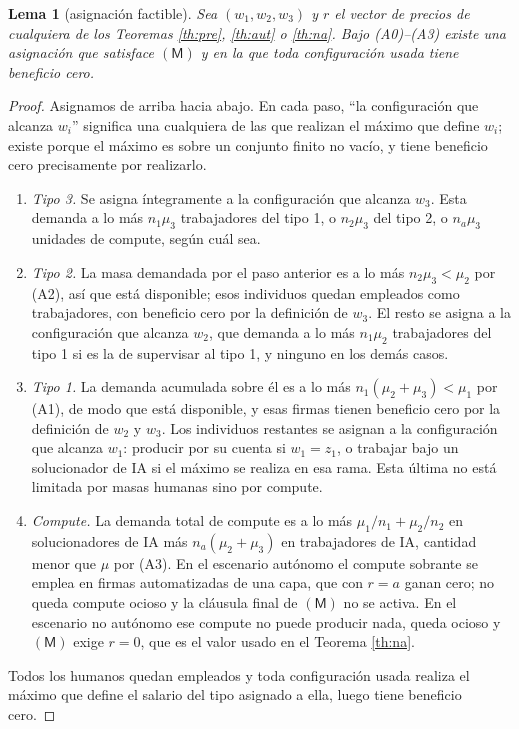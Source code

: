 \documentclass[11pt]{article}
\theoremstyle{plain}
\newtheorem{lema}{Lema}
\theoremstyle{definition}
\theoremstyle{remark}
\newcommand{\ai}{a}
\newcommand{\Mk}{\mathsf{M}}
\begin{document}
\begin{lema}[asignación factible]\label{lem:asignacion}
Sea $(w_1,w_2,w_3)$ y $r$ el vector de precios de cualquiera de los Teoremas \ref{th:pre},
\ref{th:aut} o \ref{th:na}. Bajo (A0)--(A3) existe una asignación que satisface $(\Mk)$ y en la que
toda configuración usada tiene beneficio cero.
\end{lema}
\begin{proof}
Asignamos de arriba hacia abajo. En cada paso, ``la configuración que alcanza $w_i$'' significa una
cualquiera de las que realizan el máximo que define $w_i$; existe porque el máximo es sobre un
conjunto finito no vacío, y tiene beneficio cero precisamente por realizarlo.
\begin{enumerate}[label=(\arabic*),leftmargin=2.4em]
  \item \emph{Tipo 3.} Se asigna íntegramente a la configuración que alcanza $w_3$. Esta demanda a lo
  más $n_1\mu_3$ trabajadores del tipo 1, o $n_2\mu_3$ del tipo 2, o $n_a\mu_3$ unidades de compute,
  según cuál sea.
  \item \emph{Tipo 2.} La masa demandada por el paso anterior es a lo más $n_2\mu_3<\mu_2$ por (A2),
  así que está disponible; esos individuos quedan empleados como trabajadores, con beneficio cero por
  la definición de $w_3$. El resto se asigna a la configuración que alcanza $w_2$, que demanda a lo
  más $n_1\mu_2$ trabajadores del tipo 1 si es la de supervisar al tipo 1, y ninguno en los demás
  casos.
  \item \emph{Tipo 1.} La demanda acumulada sobre él es a lo más $n_1(\mu_2+\mu_3)<\mu_1$ por (A1), de
  modo que está disponible, y esas firmas tienen beneficio cero por la definición de $w_2$ y $w_3$.
  Los individuos restantes se asignan a la configuración que alcanza $w_1$: producir por su cuenta si
  $w_1=z_1$, o trabajar bajo un solucionador de IA si el máximo se realiza en esa rama. Esta última no
  está limitada por masas humanas sino por compute.
  \item \emph{Compute.} La demanda total de compute es a lo más $\mu_1/n_1+\mu_2/n_2$ en
  solucionadores de IA más $n_a(\mu_2+\mu_3)$ en trabajadores de IA, cantidad menor que $\mu$ por
  (A3). En el escenario autónomo el compute sobrante se emplea en firmas automatizadas de una capa,
  que con $r=\ai$ ganan cero; no queda compute ocioso y la cláusula final de $(\Mk)$ no se activa. En
  el escenario no autónomo ese compute no puede producir nada, queda ocioso y $(\Mk)$ exige $r=0$, que
  es el valor usado en el Teorema \ref{th:na}.
\end{enumerate}
Todos los humanos quedan empleados y toda configuración usada realiza el máximo que define el salario
del tipo asignado a ella, luego tiene beneficio cero. \qedhere
\end{proof}
\end{document}
